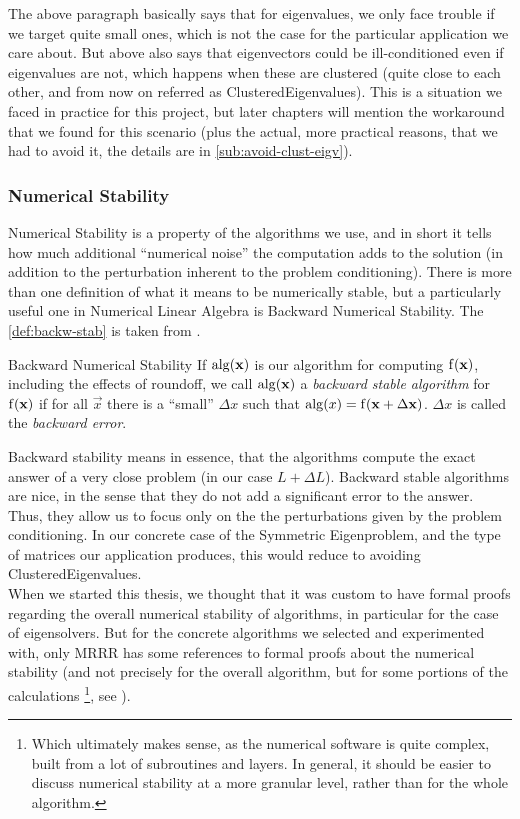 The above paragraph basically says that for eigenvalues, we only face
trouble if we target quite small ones, which is not the case for the
particular application we care about. But above also says that
eigenvectors could be ill-conditioned even if eigenvalues are not,
which happens when these are clustered (quite close to each
other, and from now on referred as \gls{ClusteredEigenvalues}). This
is a situation we faced in practice for this project, but 
later chapters will mention the workaround that we found for this
scenario (plus the actual, more practical reasons, that we had to avoid
it, the details are in \cref{sub:avoid-clust-eigv}). 

\subsubsection{Numerical Stability}

Numerical Stability is a property of the algorithms we use, and in
short it tells how much additional ``numerical noise'' the computation
adds to the solution (in addition to the perturbation inherent to the
problem conditioning). There is more than one definition of what it
means to be numerically stable, but a particularly useful one in Numerical
Linear Algebra is Backward Numerical Stability. The
\cref{def:backw-stab} is taken from \cite{demmel97}. 

\begin{definition}{Backward Numerical Stability}
  \label{def:backw-stab}
  If $\operatorname{alg}(\mathbf{x})$ is our algorithm for computing $\operatorname{f}(\mathbf{x})$,
  including the effects of roundoff, we call $\operatorname{alg}(\mathbf{x})$ a
  \emph{backward stable algorithm} for $\operatorname{f}(\mathbf{x})$ if for all
  $\vec{x}$ there is a ``small'' $\Delta x$ such that $\operatorname{alg}(x) =
  \operatorname{f}(\mathbf{x} + \Delta \mathbf{x})$. $\Delta x$ is called the
  \emph{backward error}.
\end{definition}

Backward stability means
in essence, that the algorithms compute the exact answer of a very
close problem (in our case $L + \Delta L$). Backward stable algorithms are 
nice, in the sense that they do not add a significant error to the
answer. Thus, they allow us to focus only on the
the perturbations given by the problem conditioning. In our concrete
case of the Symmetric Eigenproblem, and the type of matrices our
application produces, this would reduce to avoiding
\gls{ClusteredEigenvalues}. \\

When we started this thesis, we thought that it was custom to have
formal proofs regarding the overall numerical stability of algorithms,
in particular for the case  of eigensolvers. But for the concrete
algorithms we selected and experimented with, only \gls{MRRR} has some
references to formal proofs about the numerical stability (and not
precisely for the overall algorithm, but for some portions of the
calculations \footnote{Which ultimately makes sense, as the numerical
software is quite complex, built from a lot of subroutines and
layers. In general, it should be easier to discuss numerical stability
at a more granular level, rather than for the whole algorithm.}, see
\cite{dhillon06}). \\   

